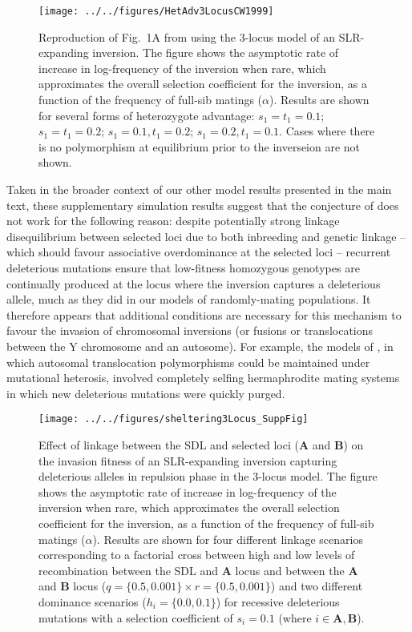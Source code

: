 \documentclass{article}
\def\mbf#1{\mathbf{#1}}
\begin{document}
\begin{appendices}
 \begin{figure}[htbp]
 \centering
 \texttt{[image: ../../figures/HetAdv3LocusCW1999]}
 \caption{Reproduction of Fig.~1A from \citet{CharlesworthWall1999} using the 3-locus model of an SLR-expanding inversion. The figure shows the asymptotic rate of increase in log-frequency of the inversion when rare, which approximates the overall selection coefficient for the inversion, as a function of the frequency of full-sib matings ($\alpha$). Results are shown for several forms of heterozygote advantage: $s_1 = t_1 = 0.1$;  $s_1 = t_1 = 0.2$;  $s_1 = 0.1, t_1 = 0.2$;  $s_1 = 0.2, t_1 = 0.1$. Cases where there is no polymorphism at equilibrium prior to the inverseion are not shown.}
 \label{fig:3Loc-CW1999}
 \end{figure}


Taken in the broader context of our other model results presented in the main text, these supplementary simulation results suggest that the conjecture of \citet{CharlesworthWall1999} does not work for the following reason: despite potentially strong linkage disequilibrium between selected loci due to both inbreeding and genetic linkage -- which should favour associative overdominance at the selected loci -- recurrent deleterious mutations ensure that low-fitness homozygous genotypes are continually produced at the locus where the inversion captures a deleterious allele, much as they did in our models of randomly-mating populations. It therefore appears that additional conditions are necessary for this mechanism to favour the invasion of chromosomal inversions (or fusions or translocations between the Y chromosome and an autosome). For example, the models of \citet{deWaalMaleFijtCharlesworth1979}, in which autosomal translocation polymorphisms could be maintained under mutational heterosis, involved completely selfing hermaphrodite mating systems in which new deleterious mutations were quickly purged. 



 \begin{figure}[htbp]
 \centering
 \texttt{[image: ../../figures/sheltering3Locus\_SuppFig]}
 \caption{Effect of linkage between the SDL and selected loci ($\mbf{A}$ and $\mbf{B}$) on the invasion fitness of an SLR-expanding inversion capturing deleterious alleles in repulsion phase in the 3-locus model. The figure shows the asymptotic rate of increase in log-frequency of the inversion when rare, which approximates the overall selection coefficient for the inversion, as a function of the frequency of full-sib matings ($\alpha$). Results are shown for four different linkage scenarios corresponding to a factorial cross between high and low levels of recombination between the SDL and $\mbf{A}$ locus and between the $\mbf{A}$ and $\mbf{B}$ locus ($q = \{0.5, 0.001\} \times r = \{0.5, 0.001\}$) and two different dominance scenarios ($h_{i} = \{ 0.0, 0.1 \}$) for recessive deleterious mutations with a selection coefficient of $s_i = 0.1$ (where $i \in {\mbf{A}, \mbf{B}}$).}
 \label{fig:3Loc-Sheltering-QR}
 \end{figure}








\end{appendices}
\end{document}

